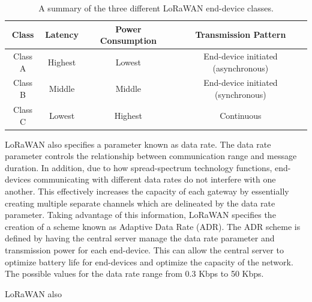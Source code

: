 \begin{table}[]
\centering
\begin{tabular}{|c|c|c|c|}
\hline
Class & Latency & Power Consumption & Transmission Pattern \\\hline
\hline
Class A & Highest & Lowest & End-device initiated (asynchronous) \\\hline
Class B & Middle & Middle & End-device initiated (synchronous) \\\hline
Class C & Lowest & Highest & Continuous \\\hline
\end{tabular}
\caption{A summary of the three different LoRaWAN end-device classes.}
\label{tab:lorawan-classes}
\end{table}

LoRaWAN also specifies a parameter known as data rate. The data rate parameter controls the relationship between communication range and message duration. In addition, due to how spread-spectrum technology functions, end-devices communicating with different data rates do not interfere with one another. This effectively increases the capacity of each gateway by essentially creating multiple separate channels which are delineated by the data rate parameter. Taking advantage of this information, LoRaWAN specifies the creation of a scheme known as Adaptive Data Rate (ADR). The ADR scheme is defined by having the central server manage the data rate parameter and transmission power for each end-device. This can allow the central server to optimize battery life for end-devices and optimize the capacity of the network. The possible values for the data rate range from 0.3 Kbps to 50 Kbps.

LoRaWAN also